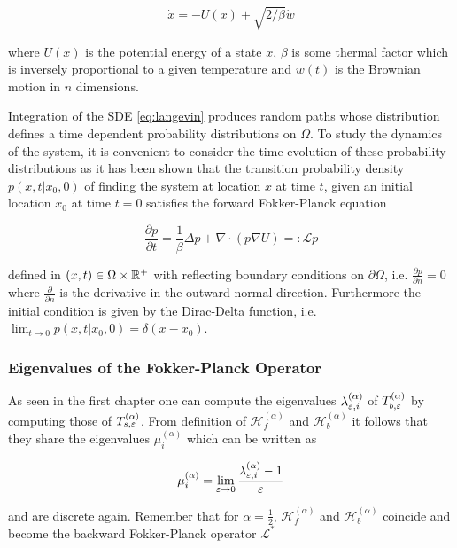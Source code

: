 \begin{equation}\label{eq:langevin}
\dot{x}=-U(x)+\sqrt{2/\beta}\dot{w}
\end{equation}

where $U(x)$ is the potential energy of a state $x$, $\beta$ is some thermal factor which is inversely proportional to a given temperature and $w(t)$ is the Brownian motion in $n$ dimensions.

Integration of the SDE \eqref{eq:langevin} produces random paths whose distribution defines a time dependent probability distributions on $\Omega$. To study the dynamics of the system, it is convenient to consider the time evolution of these probability distributions as it has been shown that the transition probability density $p(x, t | x_0, 0)$ of finding the system at location $x$ at time $t$, given an initial location $x_0$ at time $t = 0$ satisfies the forward Fokker-Planck equation

\begin{equation}\label{eq:fokkerplanck}
\frac{\partial p}{\partial t} = \frac{1}{\beta}\Delta p + \nabla\cdot(p\nabla U) =: \mathcal{L}p
\end{equation}

defined in $(x,t)\in \Omega\times\mathbb{R}^+$ with reflecting boundary conditions on $\partial\Omega$, i.e. $\frac{\partial p}{\partial n} = 0$ where $\frac{\partial}{\partial n}$ is the derivative in the outward normal direction. Furthermore the initial condition is given by the Dirac-Delta function, i.e. $\lim_{t\rightarrow 0} p(x, t | x_0, 0) = \delta(x-x_0)$.

\subsubsection{Eigenvalues of the Fokker-Planck Operator}
As seen in the first chapter one can compute the eigenvalues $\lambda_{\varepsilon, i}^{(\alpha)}$ of $T_{b,\varepsilon}^{(\alpha)}$ by computing those of $T_{s,\varepsilon}^{(\alpha)}$. From definition of $\mathcal{H}_f^{(\alpha)}$ and $\mathcal{H}_b^{(\alpha)}$ it follows that they share the eigenvalues $\mu_i^{(\alpha)}$ which can be written as

\begin{equation*}
\mu_i^{(\alpha)} = \lim_{\varepsilon\rightarrow 0}\frac{\lambda_{\varepsilon, i}^{(\alpha)}-1}{\varepsilon} 
\end{equation*}

and are discrete again. Remember that for $\alpha=\frac{1}{2}$, $\mathcal{H}_f^{(\alpha)}$ and $\mathcal{H}_b^{(\alpha)}$ coincide and become the backward Fokker-Planck operator $\mathcal{L}^*$

